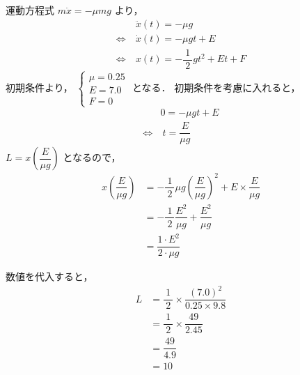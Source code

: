 \documentclass[a4paper,11pt]{ltjsarticle}
\begin{document}
\begin{enumerate}
    運動方程式 $m \ddot{x}=-\mu mg$ より，
    \begin{equation*}
      \begin{aligned}
        &\ \ddot{x}(t) = - \mu g \\
        \Leftrightarrow &\ \dot{x}(t) = - \mu gt + E \\
        \Leftrightarrow &\ x(t) = -\dfrac{1}{\ 2\ }gt^{2}+Et+F
      \end{aligned}
    \end{equation*}
    初期条件より，
    $
    \begin{cases}
      \mu = 0.25 \\
      E = 7.0 \\
      F = 0
    \end{cases}
    $
    となる．
    初期条件を考慮に入れると，
    \begin{equation*}
      \begin{aligned}
        & 0= - \mu gt + E \\
        \Leftrightarrow &\ t= \dfrac{E}{\mu g}
      \end{aligned}
    \end{equation*}
    $L = x \left(\dfrac{E}{\mu g}\right)$ となるので，
    \begin{equation*}
      \begin{aligned}
        x \left(\dfrac{E}{\mu g}\right) &= -\dfrac{1}{\ 2\ } \mu g \left(\dfrac{E}{\mu g}\right)^{2} + E \times \dfrac{E}{\mu g} \\
                                        &= -\dfrac{1}{\ 2\ } \dfrac{E^{2}}{\mu g} + \dfrac{E^{2}}{\mu g} \\
                                        &= \dfrac{1 \cdot E^{2}}{2 \cdot \mu g}
      \end{aligned}
    \end{equation*}

\clearpage

    数値を代入すると，
    \begin{equation*}
      \begin{aligned}
        L &= \dfrac{1}{\ 2\ } \times \dfrac{(7.0)^2}{0.25 \times 9.8} \\
          &= \dfrac{1}{\ 2\ } \times \dfrac{49}{2.45} \\
          &= \dfrac{49}{4.9} \\
          &= 10
      \end{aligned}
    \end{equation*}

\end{enumerate}
\end{document}
